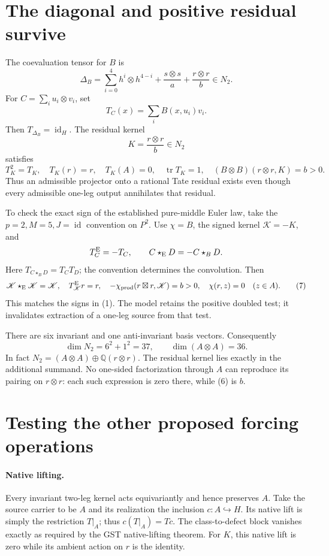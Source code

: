\documentclass[11pt]{article}
\newcommand{\Q}{\mathbb Q}
\newcommand{\tr}{\operatorname{tr}}
\newcommand{\id}{\operatorname{id}}
\begin{document}
\section{The diagonal and positive residual survive}
The coevaluation tensor for \(B\) is
\[
 \Delta_B=\sum_{i=0}^4 h^i\otimes h^{4-i}
                  +\frac{s\otimes s}{a}+\frac{r\otimes r}{b}
                  \in N_2.                                  \tag{5}
\]
For \(C=\sum_i u_i\otimes v_i\), set
\[
 T_C(x)=\sum_i B(x,u_i)v_i.
\]
Then \(T_{\Delta_B}=\id_H\). The residual kernel
\[
 K=\frac{r\otimes r}{b}\in N_2
\]
satisfies
\[
 T_K^2=T_K,\quad T_K(r)=r,\quad T_K(A)=0,\quad
 \tr T_K=1,\quad
 (B\otimes B)(r\otimes r,K)=b>0.                              \tag{6}
\]
Thus an admissible projector onto a rational Tate residual exists
even though every admissible one-leg output annihilates that residual.

To check the exact sign of the established pure-middle Euler law,
take the \(p=2,M=5,J=\id\) convention on \(P^2\). Use
\(\chi=B\), the signed kernel \(\mathscr K=-K\), and
\[
 T^{\rm E}_C=-T_C,\qquad
 C\star_{\rm E}D=-C\star_BD .
\]
Here \(T_{C\star_BD}=T_C T_D\); the convention determines the
convolution. Then
\[
 \mathscr K\star_{\rm E}\mathscr K=\mathscr K,\quad
 T^{\rm E}_{\mathscr K}r=r,\quad
 -\chi_{\rm prod}(r\boxtimes r,\mathscr K)=b>0,\quad
 \chi(r,z)=0\quad(z\in A).                                  \tag{7}
\]
This matches the signs in (1). The model retains the positive doubled
test; it invalidates extraction of a one-leg source from that test.

There are six invariant and one anti-invariant basis vectors.
Consequently
\[
 \dim N_2=6^2+1^2=37,\qquad \dim(A\otimes A)=36.
\]
In fact \(N_2=(A\otimes A)\oplus\Q(r\otimes r)\).
The residual kernel lies exactly in the additional summand.
No one-sided factorization through \(A\) can reproduce its pairing
on \(r\otimes r\): each such expression is zero there, while (6)
is \(b\).

\section{Testing the other proposed forcing operations}
\paragraph{Native lifting.}
Every invariant two-leg kernel acts equivariantly and hence preserves
\(A\). Take the source carrier to be \(A\) and its realization the
inclusion \(c:A\hookrightarrow H\). Its native lift is simply the
restriction \(T|_A\); thus \(c(T|_A)=Tc\).
The class-to-defect block vanishes exactly as required by the GST
native-lifting theorem. For \(K\), this native lift is zero while its
ambient action on \(r\) is the identity.
\end{document}
